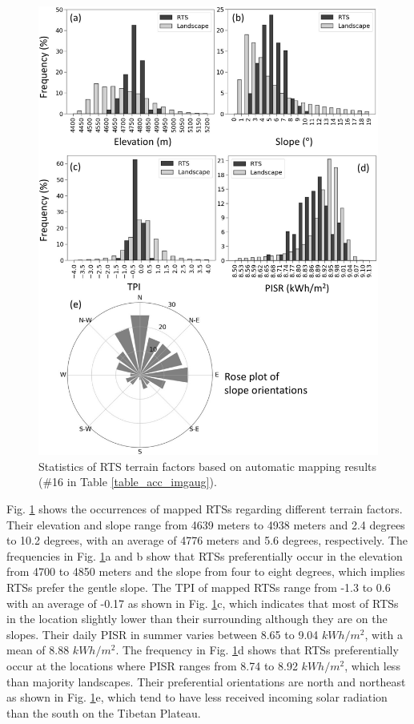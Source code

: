 \documentclass[preprint,12pt,authoryear]{elsarticle}
\begin{document}
\begin{figure}
	\centering
	\includegraphics[width=13cm]{figures/terrain_var_fig_mapped_trim.jpg}
	\caption{Statistics of RTS terrain factors based on automatic mapping results  (\#16 in Table \ref{table_acc_imgaug}). }
	\label{fig_terrain_factors}
\end{figure}

Fig. \ref{fig_terrain_factors} shows the occurrences of mapped RTSs regarding different terrain factors. Their elevation and slope range from 4639 meters to 4938 meters and 2.4 degrees to 10.2 degrees, with an average of 4776 meters and 5.6 degrees, respectively. The frequencies in Fig. \ref{fig_terrain_factors}a and b show that RTSs preferentially occur in the elevation from 4700 to 4850 meters and the slope from four to eight degrees, which implies RTSs prefer the gentle slope. The TPI of mapped RTSs range from -1.3 to 0.6 with an average of -0.17 as shown in Fig. \ref{fig_terrain_factors}c, which indicates that most of RTSs in the location slightly lower than their surrounding although they are on the slopes. Their daily PISR in summer varies between 8.65 to 9.04 $kWh/m^2$, with a mean of 8.88 $kWh/m^2$. The frequency in Fig. \ref{fig_terrain_factors}d shows that RTSs preferentially occur at the locations where PISR ranges from 8.74 to 8.92 $kWh/m^2$, which less than majority landscapes.  Their preferential orientations are north and northeast as shown in Fig. \ref{fig_terrain_factors}e, which tend to have less received incoming solar radiation than the south on the Tibetan Plateau. 
\end{document}
